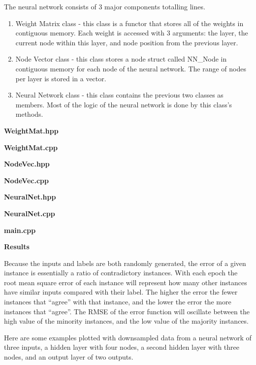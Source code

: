 \documentclass[14pt]{article}
\begin{document}
\begin{flushleft}
The neural network consists of 3 major components totalling lines.
\begin{enumerate}
	\item Weight Matrix class - this class is a functor that stores all of the weights in contiguous memory.
		Each weight is accessed with 3 arguments:
		the layer, the current node within this layer, and node position from the previous layer.
	\item Node Vector class - this class stores a node struct called NN\_Node in contiguous memory
		for each node of the neural network. The range of nodes per layer is stored in a vector.
	\item Neural Network class - this class contains the previous two classes as members.
		Most of the logic of the neural network is done by this class's methods.
\end{enumerate}


	\textbf{WeightMat.hpp}

	\textbf{WeightMat.cpp}


	\textbf{NodeVec.hpp}

	\textbf{NodeVec.cpp}


	\textbf{NeuralNet.hpp}

	\textbf{NeuralNet.cpp}


	\textbf{main.cpp}

\newpage
\textbf{Results}

Because the inputs and labels are both randomly generated,
the error of a given instance is essentially a ratio of contradictory instances.
With each epoch the root mean square error of each instance will represent
how many other instances have similar inputs compared with their label.
The higher the error the fewer instances that ``agree'' with that instance,
and the lower the error the more instances that ``agree''.
The RMSE of the error function will oscillate between the high value of the minority instances,
and the low value of the majority instances.

Here are some examples plotted with downsampled data from
a neural network of three inputs, a hidden layer with four nodes, a second hidden layer with three nodes,
and an output layer of two outputs.




\end{flushleft}
\end{document}

